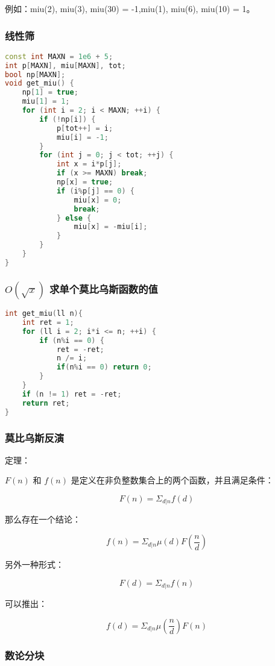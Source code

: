 例如：miu(2), miu(3), miu(30) = -1,miu(1), miu(6), miu(10) = 1。

\subsubsection{线性筛}

\begin{lstlisting}[language=C++]
const int MAXN = 1e6 + 5;
int p[MAXN], miu[MAXN], tot;
bool np[MAXN];
void get_miu() {
    np[1] = true;
    miu[1] = 1;
    for (int i = 2; i < MAXN; ++i) {
        if (!np[i]) {
            p[tot++] = i;
            miu[i] = -1;
        }
        for (int j = 0; j < tot; ++j) {
            int x = i*p[j];
            if (x >= MAXN) break;
            np[x] = true;
            if (i%p[j] == 0) {
                miu[x] = 0;
                break;
            } else {
                miu[x] = -miu[i];
            }
        }
    }
}
\end{lstlisting}

\subsubsection{$O(\sqrt{x})$ 求单个莫比乌斯函数的值}

\begin{lstlisting}[language=C++]
int get_miu(ll n){
    int ret = 1;
    for (ll i = 2; i*i <= n; ++i) {
        if (n%i == 0) {
            ret = -ret;
            n /= i;
            if(n%i == 0) return 0;
        }
    }
    if (n != 1) ret = -ret;
    return ret;
}
\end{lstlisting}

\subsubsection{莫比乌斯反演}

定理：

$F(n)$ 和 $f(n)$ 是定义在非负整数集合上的两个函数，并且满足条件：

$$F(n) = \Sigma_{d | n} f(d)$$

那么存在一个结论：

$$f(n) = \Sigma_{d | n} \mu (d) F(\frac{n}{d})$$

另外一种形式：

$$F(d) = \Sigma_{d | n} f(n)$$

可以推出：

$$f(d) = \Sigma_{d | n} \mu (\frac{n}{d}) F(n)$$

\subsubsection{数论分块}

